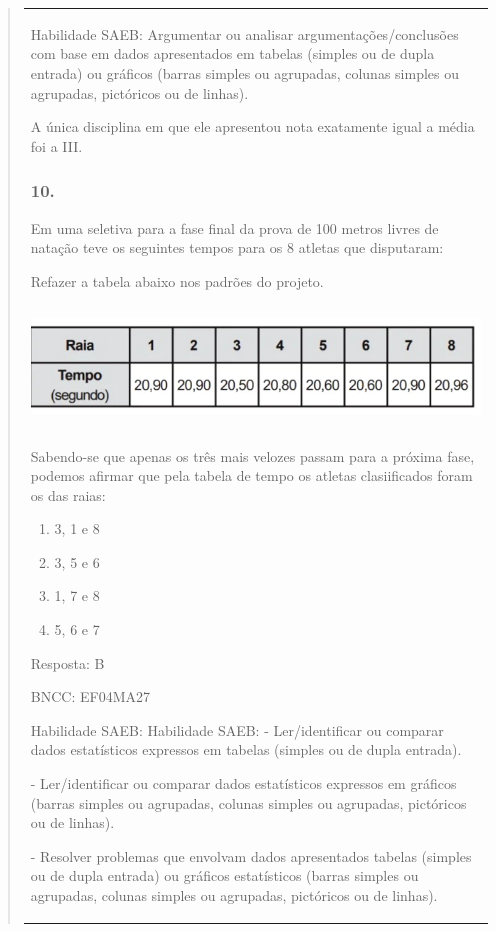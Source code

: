 \begin{enumerate}
\begin{escolha}
\begin{enumerate}
\begin{itemize}
\begin{itemize}
\begin{escolha}
\begin{quote}
\begin{escolha}
{\begin{longtable}[]{@{}l@{}}
\begin{itemize}
Habilidade SAEB: Argumentar ou analisar argumentações/conclusões com
base em dados apresentados em tabelas (simples ou de dupla entrada) ou
gráficos (barras simples ou agrupadas, colunas simples ou agrupadas,
pictóricos ou de linhas).

A única disciplina em que ele apresentou nota exatamente igual a média
foi a III.

\subsubsection{10.}\label{section-181}

Em uma seletiva para a fase final da prova de 100 metros livres de
natação teve os seguintes tempos para os 8 atletas que disputaram:

Refazer a tabela abaixo nos padrões do projeto.

\includegraphics[width=5.90556in,height=1.27708in]{media/image161.png}

Sabendo-se que apenas os três mais velozes passam para a próxima fase,
podemos afirmar que pela tabela de tempo os atletas clasiificados foram
os das raias:

\begin{enumerate}
\def\labelenumi{\alph{enumi})}
\item
  3, 1 e 8
\item
  3, 5 e 6
\item
  1, 7 e 8
\item
  5, 6 e 7
\end{enumerate}

Resposta: B

BNCC: EF04MA27

Habilidade SAEB: Habilidade SAEB: - Ler/identificar ou comparar dados
estatísticos expressos em tabelas (simples ou de dupla entrada).

- Ler/identificar ou comparar dados estatísticos expressos em gráficos
(barras simples ou agrupadas, colunas simples ou agrupadas, pictóricos
ou de linhas).

- Resolver problemas que envolvam dados apresentados tabelas (simples ou
de dupla entrada) ou gráficos estatísticos (barras simples ou agrupadas,
colunas simples ou agrupadas, pictóricos ou de linhas).


\end{itemize}
\end{longtable}}
\end{escolha}
\end{quote}
\end{escolha}
\end{itemize}
\end{itemize}
\end{enumerate}
\end{escolha}
\end{enumerate}
